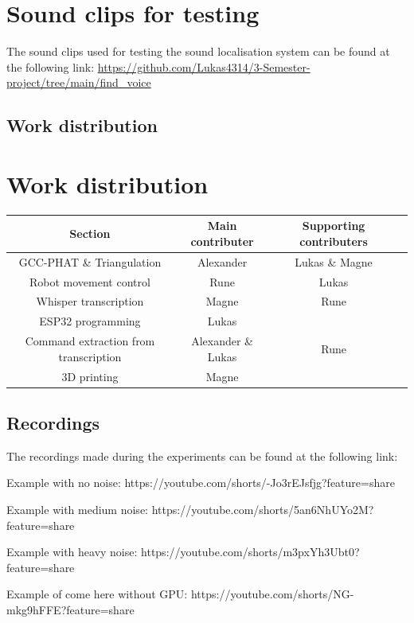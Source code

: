 \section{Sound clips for testing}\label{app:sound-clips}
The sound clips used for testing the sound localisation system can be found at the following link:
\href{https://github.com/Lukas4314/3-Semester-project/tree/main/find\_voice}{https://github.com/Lukas4314/3-Semester-project/tree/main/find\_voice}


\subsection{Work distribution}\label{app:work-distribution}
\section{Work distribution}
\begin{table}[H]
    \centering
    \begin{tabular}{c|c c c}
        Section & Main contributer & Supporting contributers \\
        \hline
        GCC-PHAT \& Triangulation & Alexander & Lukas \& Magne\\
        \hline
        Robot movement control & Rune & Lukas\\
        \hline
        Whisper transcription & Magne & Rune \\
        \hline
        ESP32 programming & Lukas\\
        \hline
        Command extraction from transcription & Alexander \& Lukas & Rune \\
        \hline
        3D printing & Magne\\
        \hline
    \end{tabular}
    \label{tab: work distribution}
\end{table}


\subsection{Recordings}\label{app:recordings}
The recordings made during the experiments can be found at the following link:

Example with no noise: https://youtube.com/shorts/-Jo3rEJsfjg?feature=share

Example with medium noise: https://youtube.com/shorts/5an6NhUYo2M?feature=share

Example with heavy noise: https://youtube.com/shorts/m3pxYh3Ubt0?feature=share

Example of come here without GPU: https://youtube.com/shorts/NG-mkg9hFFE?feature=share
